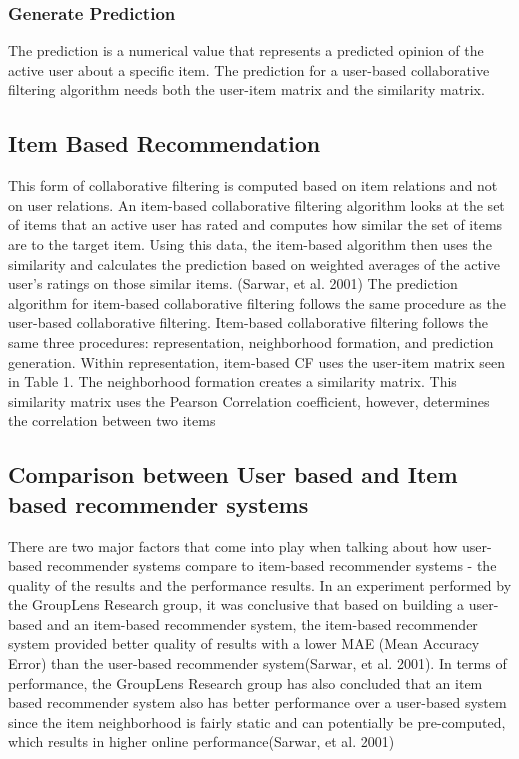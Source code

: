 \subsubsection{Generate Prediction}
The prediction is a numerical value that represents a predicted opinion of the active user about a specific item. The prediction for a user-based collaborative filtering algorithm needs both the user-item matrix and the similarity matrix.
\subsection{Item Based Recommendation}
This form of collaborative filtering is computed based on item relations and not on user relations. An item-based collaborative filtering algorithm looks at the set of items that an active user has rated and computes how similar the set of items are to the target item. Using this data, the item-based algorithm then uses the similarity and calculates the prediction based on weighted averages of the active user’s ratings on those similar items. (Sarwar, et al. 2001)
The prediction algorithm for item-based collaborative filtering follows the same procedure as the user-based collaborative filtering. Item-based collaborative filtering follows the same three procedures: representation, neighborhood formation, and prediction generation. Within representation, item-based CF uses the user-item matrix seen in Table 1. The neighborhood formation creates a similarity matrix. This  similarity matrix uses the Pearson Correlation coefficient, however, determines the correlation between two items
\subsection{Comparison between User based and Item based recommender systems}
There are two major factors that come into play when talking about how user-based recommender systems compare to item-based recommender systems - the quality of the results and the performance results. 
In an experiment performed by the GroupLens Research group, it was conclusive that based on building a user-based and an item-based recommender system, the item-based recommender system provided better quality of results with a lower MAE (Mean Accuracy Error) than the user-based recommender system(Sarwar, et al. 2001). 
In terms of performance, the GroupLens Research group has also concluded that an  item based recommender system also has better performance over a user-based system since the item neighborhood is fairly static and can potentially be pre-computed, which results in higher online performance(Sarwar, et al. 2001)
